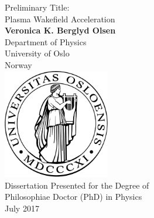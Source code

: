 \begin{titlepage}
    \begin{center}
        \vspace*{10mm}
        \huge{}
        Preliminary Title:\\
        Plasma Wakefield Acceleration\\
        \vspace{20mm}
        \large
        \textbf{Veronica K. Berglyd Olsen}\\
        Department of Physics\\
        University of Oslo\\
        Norway\\
        \vfill
        \includegraphics[width=0.35\textwidth]{images/UiOLogo.pdf}\\
        \vspace{20mm}
        Dissertation Presented for the Degree of\\
        Philosophiae Doctor (PhD) in Physics\\
        \vspace{10mm}
        \large{July 2017}
    \end{center}
\end{titlepage}
